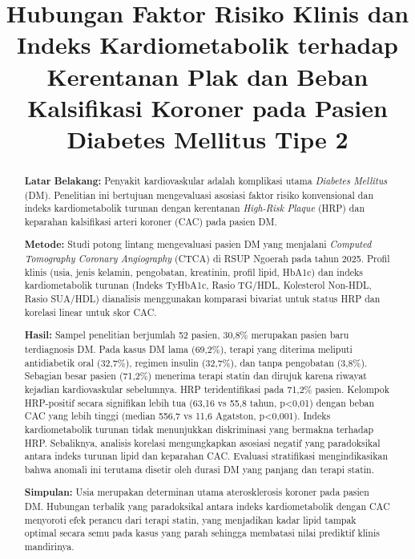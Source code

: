 \documentclass[
  indonesian,
]{agujournal2019}
\begin{document}
\title{Hubungan Faktor Risiko Klinis dan Indeks Kardiometabolik terhadap
Kerentanan Plak dan Beban Kalsifikasi Koroner pada Pasien Diabetes
Mellitus Tipe 2}



\begin{abstract}
\textbf{Latar Belakang:} Penyakit kardiovaskular adalah komplikasi utama
\emph{Diabetes Mellitus} (DM). Penelitian ini bertujuan mengevaluasi
asosiasi faktor risiko konvensional dan indeks kardiometabolik turunan
dengan kerentanan \emph{High-Risk Plaque} (HRP) dan keparahan
kalsifikasi arteri koroner (CAC) pada pasien DM.

\textbf{Metode:} Studi potong lintang mengevaluasi pasien DM yang
menjalani \emph{Computed Tomography Coronary Angiography} (CTCA) di RSUP
Ngoerah pada tahun 2025. Profil klinis (usia, jenis kelamin, pengobatan,
kreatinin, profil lipid, HbA1c) dan indeks kardiometabolik turunan
(Indeks TyHbA1c, Rasio TG/HDL, Kolesterol Non-HDL, Rasio SUA/HDL)
dianalisis menggunakan komparasi bivariat untuk status HRP dan korelasi
linear untuk skor CAC.

\textbf{Hasil:} Sampel penelitian berjumlah 52 pasien, 30,8\% merupakan
pasien baru terdiagnosis DM. Pada kasus DM lama (69,2\%), terapi yang
diterima meliputi antidiabetik oral (32,7\%), regimen insulin (32,7\%),
dan tanpa pengobatan (3,8\%). Sebagian besar pasien (71,2\%) menerima
terapi statin dan dirujuk karena riwayat kejadian kardiovaskular
sebelumnya. HRP teridentifikasi pada 71,2\% pasien. Kelompok HRP-positif
secara signifikan lebih tua (63,16 vs 55,8 tahun, p\textless0,01) dengan
beban CAC yang lebih tinggi (median 556,7 vs 11,6 Agatston,
p\textless0,001). Indeks kardiometabolik turunan tidak menunjukkan
diskriminasi yang bermakna terhadap HRP. Sebaliknya, analisis korelasi
mengungkapkan asosiasi negatif yang paradoksikal antara indeks turunan
lipid dan keparahan CAC. Evaluasi stratifikasi mengindikasikan bahwa
anomali ini terutama disetir oleh durasi DM yang panjang dan terapi
statin.

\textbf{Simpulan:} Usia merupakan determinan utama aterosklerosis
koroner pada pasien DM. Hubungan terbalik yang paradoksikal antara
indeks kardiometabolik dengan CAC menyoroti efek perancu dari terapi
statin, yang menjadikan kadar lipid tampak optimal secara semu pada
kasus yang parah sehingga membatasi nilai prediktif klinis mandirinya.


\end{abstract}
\end{document}
